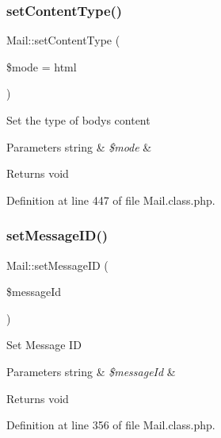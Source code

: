 \subsubsection{\texorpdfstring{set\+Content\+Type()}{setContentType()}}
{\footnotesize\ttfamily Mail\+::set\+Content\+Type (\begin{DoxyParamCaption}\item[{}]{\$mode = {\ttfamily \textquotesingle{}html\textquotesingle{}} }\end{DoxyParamCaption})}

Set the type of body\textquotesingle{}s content


\begin{DoxyParams}[1]{Parameters}
string & {\em \$mode} & \\
\hline
\end{DoxyParams}
\begin{DoxyReturn}{Returns}
void 
\end{DoxyReturn}


Definition at line 447 of file Mail.\+class.\+php.

\hypertarget{classMail_a51becbf02e5e415277fa8f4049ece136}{}\label{classMail_a51becbf02e5e415277fa8f4049ece136} 
\subsubsection{\texorpdfstring{set\+Message\+I\+D()}{setMessageID()}}
{\footnotesize\ttfamily Mail\+::set\+Message\+ID (\begin{DoxyParamCaption}\item[{}]{\$message\+Id }\end{DoxyParamCaption})}

Set Message ID


\begin{DoxyParams}[1]{Parameters}
string & {\em \$message\+Id} & \\
\hline
\end{DoxyParams}
\begin{DoxyReturn}{Returns}
void 
\end{DoxyReturn}


Definition at line 356 of file Mail.\+class.\+php.

\hypertarget{classMail_aa1ffe38b98a8d9eb618133c3dff48f90}{}\label{classMail_aa1ffe38b98a8d9eb618133c3dff48f90} 
